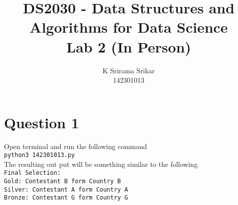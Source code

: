 \documentclass{article}
\title{\textbf{DS2030 - Data Structures and Algorithms for Data Science \\Lab 2 (In Person)}}
\author{K Srirama Srikar \\142301013 }
\date{}
\begin{document}
\maketitle
\section{Question 1}
Open terminal and run the following command \\ \texttt{python3 142301013.py} \\  The resulting out put will be something similar to the following  \\
\texttt{Final Selection: \\Gold: Contestant B form Country B \\ Silver: Contestant A form Country A \\ Bronze: Contestant G form Country G} \\
\end{document}
